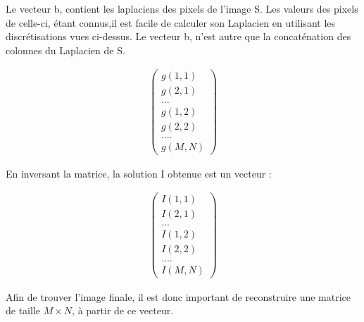 Le vecteur b, contient les laplaciens des pixels de l'image S.
Les valeurs des pixels de celle-ci, étant connus,il est facile de calculer son Laplacien en utilisant les discrétisations vues ci-dessus. Le vecteur b, n'est autre que la concaténation des colonnes du Laplacien de S.
\begin{center}
\begin{equation}
\left.
\begin{aligned}
\begin{pmatrix}
g(1,1)\\
g(2,1)\\
...\\
g(1,2)\\
g(2,2)\\
....\\
g(M, N)
\end{pmatrix}
\end{aligned}
\right.
\end{equation}
\end{center}
En inversant la matrice, la solution I obtenue est un vecteur : 
\begin{center}
\begin{equation}
\left.
\begin{aligned}
\begin{pmatrix}
I(1,1)\\
I(2,1)\\
...\\
I(1,2)\\
I(2,2)\\
....\\
I(M, N)
\end{pmatrix}
\end{aligned}
\right.
\end{equation}
\end{center}
Afin de trouver l'image finale, il est donc important de reconstruire une matrice de taille $M\times N$, à partir de ce vecteur. 

